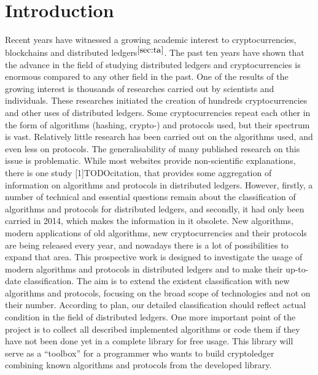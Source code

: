 \documentclass[12pt]{article}
\begin{document}
\section{Introduction}
Recent years have witnessed a growing academic interest to cryptocurrencies,
blockchains and distributed ledgers$^{\autoref{sec:ta}}$. The past ten years
have shown that the advance in the field of studying distributed ledgers and
cryptocurrencies is enormous compared to any other field in the past. One of
the results of the growing interest is thousands of researches carried out by
scientists and individuals. These researches initiated the creation of hundreds
cryptocurrencies and other uses of distributed ledgers. Some cryptocurrencies
repeat each other in the form of algorithms (hashing, crypto-) and protocols
used, but their spectrum is vast. Relatively little research has been carried
out on the algorithms used, and even less on protocols. The generalisability of
many published research on this issue is problematic. While most websites provide
non-scientific explanations, there is one study [1]TODOcitation, that provides
some aggregation of information on algorithms and protocols in distributed
ledgers. However, firstly, a number of technical and essential questions remain
about the classification of algorithms and protocols for distributed ledgers,
and secondly, it had only been carried in 2014, which makes the information in
it obsolete. New algorithms, modern applications of old algorithms, new
cryptocurrencies and their protocols are being released every year, and nowadays
there is a lot of possibilities to expand that area. This prospective work is
designed to investigate the usage of modern algorithms and protocols in
distributed ledgers and to make their up-to-date classification. The aim is
to extend the existent classification with new algorithms and protocols,
focusing on the broad scope of technologies and not on their number.
According to plan, our detailed classification should reflect actual condition in the
field of distributed ledgers. One more important point of the project is to
collect all described implemented algorithms or code them if they have not
been done yet in a complete library for free usage. This library will
serve as a ``toolbox'' for a programmer who wants to build
cryptoledger combining known algorithms and protocols from the developed
library.

\end{document}
